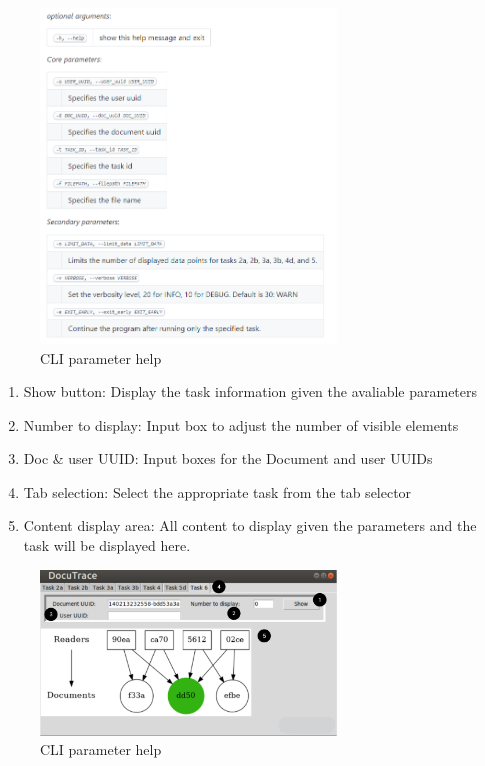 \documentclass[11pt]{article}
\begin{document}
\begin{figure}[H]
    \centering
    \includegraphics[width=0.7\textwidth]{CLlhelp.png}
    \caption{CLI parameter help}
    \label{fig:CLIhelp}
\end{figure}
\newpage
\begin{enumerate}
    \item Show button: Display the task information given the avaliable parameters
    \item Number to display: Input box to adjust the number of visible elements
    \item Doc \& user UUID: Input boxes for the Document and user UUIDs
    \item Tab selection: Select the appropriate task from the tab selector
    \item Content display area: All content to display given the parameters and the task will be displayed here.
\end{enumerate}

\begin{figure}[H]
    \centering
    \includegraphics[width=0.7\textwidth]{Task6Tab.png}
    \caption{CLI parameter help}
    \label{fig:GraphAnnotated}
\end{figure}
\end{document}
